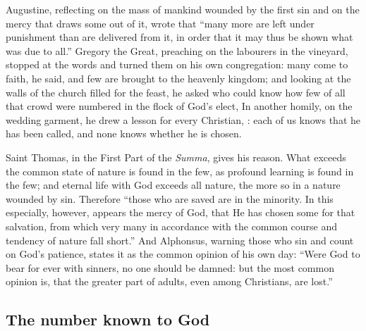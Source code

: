 Augustine, reflecting on the mass of mankind wounded by the first sin and on the mercy that draws some out of it, wrote that ``many more are left under punishment than are delivered from it, in order that it may thus be shown what was due to all.'' Gregory the Great, preaching on the labourers in the vineyard, stopped at the words  and turned them on his own congregation: many come to faith, he said, and few are brought to the heavenly kingdom; and looking at the walls of the church filled for the feast, he asked who could know how few of all that crowd were numbered in the flock of God's elect,  In another homily, on the wedding garment, he drew a lesson for every Christian, : each of us knows that he has been called, and none knows whether he is chosen.

Saint Thomas, in the First Part of the \emph{Summa}, gives his reason. What exceeds the common state of nature is found in the few, as profound learning is found in the few; and eternal life with God exceeds all nature, the more so in a nature wounded by sin. Therefore ``those who are saved are in the minority. In this especially, however, appears the mercy of God, that He has chosen some for that salvation, from which very many in accordance with the common course and tendency of nature fall short.'' And Alphonsus, warning those who sin and count on God's patience, states it as the common opinion of his own day: ``Were God to bear for ever with sinners, no one should be damned: but the most common opinion is, that the greater part of adults, even among Christians, are lost.''

\subsection{The number known to God}

